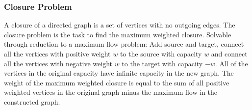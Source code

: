 
\subsubsection{Closure Problem}

A closure of a directed graph is a set of vertices with no outgoing
edges.  The closure problem is the task to find the maximum weighted
closure.  Solvable through reduction to a maximum flow problem: Add
source and target, connect all the vertices with positive weight $w$
to the source with capacity $w$ and connect all the vertices with
negative weight $w$ to the target with capacity $-w$.  All of the
vertices in the original capacity have infinite capacity in the new
graph.  The weight of the maximum weighted closure is equal to the sum
of all positive weighted vertices in the original graph minus the
maximum flow in the constructed graph.

